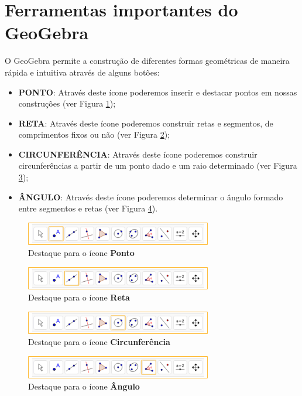 \documentclass[11pt,a4paper]{article}
\begin{document}
\section{Ferramentas importantes do GeoGebra}
O GeoGebra permite a construção de diferentes formas geométricas de maneira rápida e intuitiva através de alguns botões:
\begin{itemize}
    \item {\bf PONTO}: Através deste ícone poderemos inserir e destacar pontos em nossas construções (ver Figura \ref{ponto});
    \item {\bf RETA}: Através deste ícone poderemos construir retas e segmentos, de comprimentos fixos ou não (ver Figura \ref{reta});
    \item {\bf CIRCUNFERÊNCIA}: Através deste ícone poderemos construir circunferências a partir de um ponto dado e um raio determinado (ver Figura \ref{circunferencia});
    \item {\bf ÂNGULO}: Através deste ícone poderemos determinar o ângulo formado entre segmentos e retas (ver Figura \ref{angulo}).
\end{itemize}
\begin{figure}[H]
    \centering
    \includegraphics[height=1cm]{Figuras/T01_Ferramenta01.png}
    \caption{Destaque para o ícone {\bf Ponto}}
    \label{ponto}
\end{figure}
\begin{figure}[H]
    \centering
    \includegraphics[height=1cm]{Figuras/T01_Ferramenta02.png}
    \caption{Destaque para o ícone {\bf Reta}}
    \label{reta}
\end{figure}
\begin{figure}[H]
    \centering
    \includegraphics[height=1cm]{Figuras/T01_Ferramenta03.png}
    \caption{Destaque para o ícone {\bf Circunferência}}
    \label{circunferencia}
\end{figure}
\begin{figure}[H]
    \centering
    \includegraphics[height=1cm]{Figuras/T01_Ferramenta04.png}
    \caption{Destaque para o ícone {\bf Ângulo}}
    \label{angulo}
\end{figure}
\end{document}

